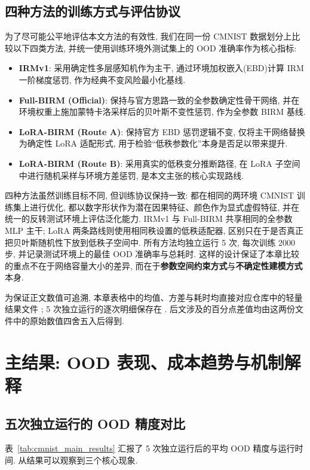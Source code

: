 \documentclass[a4paper,punct=banjiao,twoside]{ctexrep}
\theoremstyle{plain}
\theoremstyle{definition}
\theoremstyle{remark}
\begin{document}
\subsection{四种方法的训练方式与评估协议}
为了尽可能公平地评估本文方法的有效性, 我们在同一份 CMNIST 数据划分上比较以下四类方法, 并统一使用训练环境外测试集上的 OOD 准确率作为核心指标:
\begin{itemize}
    \item \textbf{IRMv1}: 采用确定性多层感知机作为主干, 通过环境加权嵌入(EBD)计算 IRM 一阶梯度惩罚, 作为经典不变风险最小化基线.
    \item \textbf{Full-BIRM (Official)}: 保持与官方思路一致的全参数确定性骨干网络, 并在环境权重上施加蒙特卡洛采样后的贝叶斯不变性惩罚, 作为全参数 BIRM 基线.
    \item \textbf{LoRA-BIRM (Route A)}: 保持官方 EBD 惩罚逻辑不变, 仅将主干网络替换为确定性 LoRA 适配形式, 用于检验“低秩参数化”本身是否足以带来提升.
    \item \textbf{LoRA-BIRM (Route B)}: 采用真实的低秩变分推断路径, 在 LoRA 子空间中进行随机采样与环境方差惩罚, 是本文主张的核心实现路线.
\end{itemize}

四种方法虽然训练目标不同, 但训练协议保持一致: 都在相同的两环境 CMNIST 训练集上进行优化, 都以数字形状作为潜在因果特征、颜色作为显式虚假特征, 并在统一的反转测试环境上评估泛化能力. IRMv1 与 Full-BIRM 共享相同的全参数 MLP 主干; LoRA 两条路线则使用相同秩设置的低秩适配器, 区别只在于是否真正把贝叶斯随机性下放到低秩子空间中. 所有方法均独立运行 5 次, 每次训练 2000 步, 并记录测试环境上的最佳 OOD 准确率与总耗时. 这样的设计保证了本章比较的重点不在于网络容量大小的差异, 而在于\textbf{参数空间约束方式}与\textbf{不确定性建模方式}本身.

为保证正文数值可追溯, 本章表格中的均值、方差与耗时均直接对应仓库中的轻量结果文件 ; 5 次独立运行的逐次明细保存在 . 后文涉及的百分点差值均由这两份文件中的原始数值四舍五入后得到.

\section{主结果: OOD 表现、成本趋势与机制解释}
\subsection{五次独立运行的 OOD 精度对比}
表~\ref{tab:cmnist_main_results} 汇报了 5 次独立运行后的平均 OOD 精度与运行时间. 从结果可以观察到三个核心现象.
\end{document}
